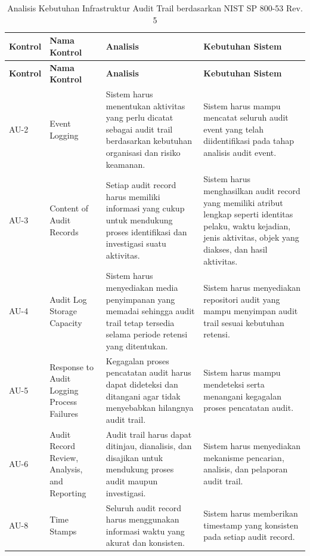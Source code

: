 \begin{xltabular}{\textwidth}{|p{1.8cm}|p{3.5cm}|X|X|}
\caption{Analisis Kebutuhan Infrastruktur Audit Trail berdasarkan NIST SP 800-53 Rev. 5}
\label{tab:analisis_kontrol_nist}\\

\hline
\textbf{Kontrol} &
\textbf{Nama Kontrol} &
\textbf{Analisis} &
\textbf{Kebutuhan Sistem}\\
\hline
\endfirsthead

\hline
\textbf{Kontrol} &
\textbf{Nama Kontrol} &
\textbf{Analisis} &
\textbf{Kebutuhan Sistem}\\
\hline
\endhead

\hline
\endfoot

AU-2 &
Event Logging &
Sistem harus menentukan aktivitas yang perlu dicatat sebagai audit trail berdasarkan kebutuhan organisasi dan risiko keamanan. &
Sistem harus mampu mencatat seluruh audit event yang telah diidentifikasi pada tahap analisis audit event.\\
\hline

AU-3 &
Content of Audit Records &
Setiap audit record harus memiliki informasi yang cukup untuk mendukung proses identifikasi dan investigasi suatu aktivitas. &
Sistem harus menghasilkan audit record yang memiliki atribut lengkap seperti identitas pelaku, waktu kejadian, jenis aktivitas, objek yang diakses, dan hasil aktivitas.\\
\hline

AU-4 &
Audit Log Storage Capacity &
Sistem harus menyediakan media penyimpanan yang memadai sehingga audit trail tetap tersedia selama periode retensi yang ditentukan. &
Sistem harus menyediakan repositori audit yang mampu menyimpan audit trail sesuai kebutuhan retensi.\\
\hline

AU-5 &
Response to Audit Logging Process Failures &
Kegagalan proses pencatatan audit harus dapat dideteksi dan ditangani agar tidak menyebabkan hilangnya audit trail. &
Sistem harus mampu mendeteksi serta menangani kegagalan proses pencatatan audit.\\
\hline

AU-6 &
Audit Record Review, Analysis, and Reporting &
Audit trail harus dapat ditinjau, dianalisis, dan disajikan untuk mendukung proses audit maupun investigasi. &
Sistem harus menyediakan mekanisme pencarian, analisis, dan pelaporan audit trail.\\
\hline

AU-8 &
Time Stamps &
Seluruh audit record harus menggunakan informasi waktu yang akurat dan konsisten. &
Sistem harus memberikan timestamp yang konsisten pada setiap audit record.\\
\hline


\end{xltabular}
